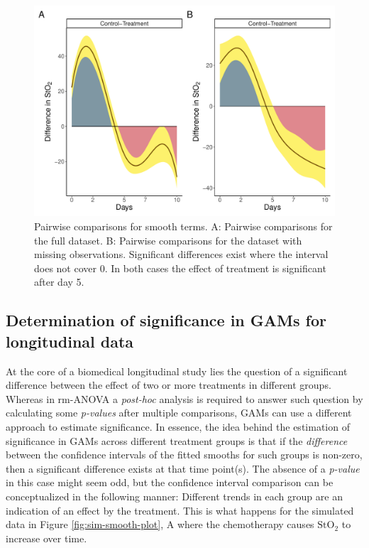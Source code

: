 \documentclass[
]{article}
\begin{document}
\begin{figure}[!h]

{\centering \includegraphics[width=0.75\linewidth,]{Full_document_files/figure-latex/plot-pairwise-comp-1} 

}

\caption{Pairwise comparisons for smooth terms. A: Pairwise comparisons for the full dataset. B: Pairwise comparisons for the dataset with missing observations. Significant differences exist where the interval does not cover 0. In both cases the effect of treatment is significant after day 5.}\label{fig:plot-pairwise-comp}
\end{figure}

\hypertarget{determination-of-significance-in-gams-for-longitudinal-data}{%
\subsection{Determination of significance in GAMs for longitudinal data}\label{determination-of-significance-in-gams-for-longitudinal-data}}

At the core of a biomedical longitudinal study lies the question of a significant difference between the effect of two or more treatments in different groups. Whereas in rm-ANOVA a \emph{post-hoc} analysis is required to answer such question by calculating some \emph{p-values} after multiple comparisons, GAMs can use a different approach to estimate significance. In essence, the idea behind the estimation of significance in GAMs across different treatment groups is that if the \emph{difference} between the confidence intervals of the fitted smooths for such groups is non-zero, then a significant difference exists at that time point(s). The absence of a \emph{p-value} in this case might seem odd, but the confidence interval comparison can be conceptualized in the following manner: Different trends in each group are an indication of an effect by the treatment. This is what happens for the simulated data in Figure \ref{fig:sim-smooth-plot}, A where the chemotherapy causes \(\mbox{StO}_2\) to increase over time.
\end{document}
